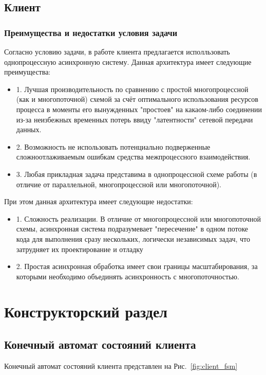 \documentclass[a4paper,12pt]{report}
\begin{document}
\section*{Клиент}
\subsection*{Преимущества и недостатки условия задачи}
Согласно условию задачи, в работе клиента предлагается исполльзовать однопроцессную асинхронную систему. Данная архитектура имеет следующие преимущества:
\begin{itemize}
    \item 1. Лучшая производительность по сравнению с простой многопроцессной (как и многопоточной) схемой за счёт оптимального использования ресурсов процесса в моменты его вынужденных "простоев" на какаом-либо соединении из-за неизбежных временных потерь ввиду "латентности" сетевой передачи данных.
    \item 2. Возможность не использовать потенциально подверженные сложноотлаживаемым ошибкам средства межпроцессного взаимодействия.
    \item 3. Любая прикладная задача представима в однопроцессной схеме работы (в отличие от параллельной, многопроцессной или многопоточной).
\end{itemize}
При этом данная архитектура имеет следующие недостатки:
\begin{itemize}
    \item 1. Сложность реализации. В отличие от многопроцессной или многопоточной схемы, асинхронная система подразумевает "пересечение" в одном потоке кода для выполнения сразу нескольких, логически независимых задач, что затрудняет их проектирование и отладку
    \item 2. Простая асинхронная обработка имеет свои границы масштабирования, за которыми необходимо объединять асинхронность с многопоточностью.
\end{itemize}
\chapter{Конструкторский раздел}

\section{Конечный автомат состояний клиента}

Конечный автомат состояний клиента представлен на Рис.~\ref{fig:client_fsm}
\end{document}
